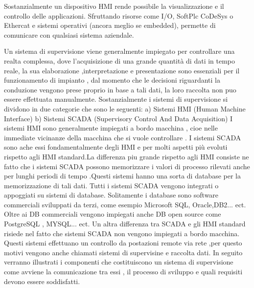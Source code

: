 \documentclass[12pt, a4paper, oneside]{book}
\begin{document}
Sostanzialmente un dispositivo HMI rende possibile la visualizzazione e il controllo delle applicazioni. Sfruttando risorse come I/O, SoftPlc CoDeSys o Ethercat e sistemi operativi (ancora meglio se embedded), permette di comunicare con qualsiasi sistema aziendale.

Un sistema di supervisione viene generalmente impiegato per controllare una realta complessa, dove l’acquisizione di una grande quantità di dati in tempo reale, la sua elaborazione ,interpretazione e presentazione sono essenziali per il funzionamento di impianto , dal momento che le decisioni riguardanti la conduzione vengono prese proprio in base a tali dati, la loro raccolta non puo essere effettuata manualmente. Sostanzialmente i sistemi di supervisione si dividono in due categorie che sono le seguenti:
a) Sistemi HMI (Human Machine Interface)
b) Sistemi SCADA (Supervisory Control And Data Acquisition)
I sistemi HMI sono generalmente impiegati a bordo macchina , cioe nelle immediate vicinanze della macchina che si vuole controllare . I sistemi SCADA sono ache essi fondamentalmente degli HMI e per molti aspetti più evoluti rispetto agli HMI standard.La differenza piu grande rispetto agli HMI consiste ne fatto che i sistemi SCADA possono memorizzare i valori di processo rilevati anche per lunghi periodi di tempo .Questi sistemi hanno una sorta di database per la memorizzazione di tali dati. Tutti i sistemi SCADA vengono integrati o appoggiati su sistemi di database. Solitamente i database sono software commerciali sviluppati da terzi, come esempio Microsoft SQL, Oracle,DB2... ect. Oltre ai DB commerciali vengono impiegati anche DB open source come PostgreSQL , MYSQL... ect. Un altra differenza tra SCADA e gli HMI standard risiede nel fatto che sistemi SCADA non vengono impiegati a bordo macchina. Questi sistemi effettuano un controllo da postazioni remote via rete ,per questo motivi vengono anche chiamati sistemi di supervisine e raccolta dati. In seguito verranno illustrati i componenti che costituiscono un sistema di supervisione come avviene la comunicazione tra essi , il processo di sviluppo e quali requisiti devono essere soddisfatti. 
\end{document}

